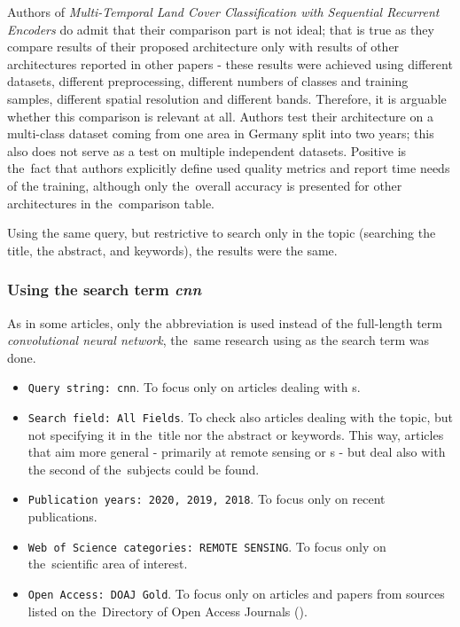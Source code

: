 
Authors of \textit{Multi-Temporal Land Cover Classification with Sequential Recurrent Encoders} do admit that their comparison part is not ideal; that is true as they compare results of their proposed architecture only with results of other architectures reported in other papers - these results were achieved using different datasets, different preprocessing, different numbers of classes and training samples, different spatial resolution and different bands. Therefore, it is arguable whether this comparison is relevant at all. Authors test their architecture on a multi-class dataset coming from one area in Germany split into two years; this also does not serve as a test on multiple independent datasets. Positive is the~fact that authors explicitly define used quality metrics and report time needs of the training, although only the~overall accuracy is presented for other architectures in the~comparison table.

Using the same query, but restrictive to search only in the topic (searching the title, the abstract, and keywords), the results were the same.

\subsubsection{Using the search term \textit{cnn}}
\label{wos-papers-cnn}

As in some articles, only the abbreviation \textit{} is used instead of the full-length term \textit{convolutional neural network}, the~same research using \textit{} as the search term was done.

\begin{itemize}
	\item \verb|Query string: cnn|. To focus only on articles dealing with s.
	\item \verb|Search field: All Fields|. To check also articles dealing with the topic, but not specifying it in the~title nor the abstract or keywords. This way, articles that aim more general - primarily at remote sensing or s - but deal also with the second of the~subjects could be found.
	\item \verb|Publication years: 2020, 2019, 2018|. To focus only on recent publications.
	\item \verb|Web of Science categories: REMOTE SENSING|. To focus only on the~scien\-ti\-fic area of interest.
	\item \verb|Open Access: DOAJ Gold|. To focus only on articles and papers from sources listed on the~Di\-rectory of Open Access Journals ().
\end{itemize}

